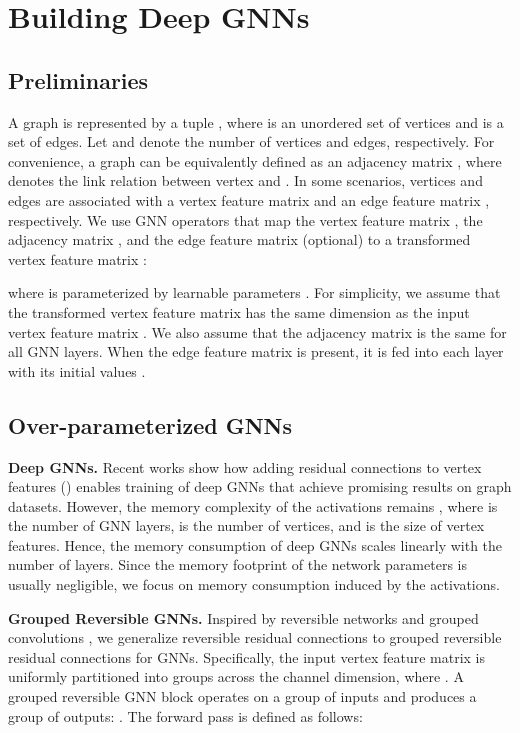 \documentclass{article}
\newcommand{\mysection}[1]{\vspace{0pt}\noindent\textbf{#1.}}
\begin{document}
\section{Building Deep GNNs}
\subsection{Preliminaries}
A graph  is represented by a tuple , where  is an unordered set of vertices and  is a set of edges. Let  and  denote the number of vertices and edges, respectively. For convenience, a graph can be equivalently defined as an adjacency matrix , where  denotes the link relation between vertex  and . In some scenarios, vertices and edges are associated with a vertex feature matrix  and an edge feature matrix , respectively.
We use GNN operators that map the vertex feature matrix , the adjacency matrix , and the edge feature matrix  (optional) to a transformed vertex feature matrix :

where  is parameterized by learnable parameters . For simplicity, we assume that the transformed vertex feature matrix  has the same dimension as the input vertex feature matrix . We also assume that the adjacency matrix  is the same for all GNN layers. When the edge feature matrix  is present, it is fed into each layer with its initial values .

\subsection{Over-parameterized GNNs}
\mysection{Deep GNNs}  Recent works \citep{li2019deepgcns, li2020deepergcn} show how adding residual connections \citep{he2016deep} to vertex features () enables training of deep GNNs that achieve promising results on graph datasets. 
However, the memory complexity of the activations remains , where  is the number of GNN layers,  is the number of vertices, and  is the size of vertex features. Hence, the memory consumption of deep GNNs scales linearly with the number of layers. Since the memory footprint of the network parameters is usually negligible, we focus on memory consumption induced by the activations.

\mysection{Grouped Reversible GNNs} \label{grgnn}
Inspired by reversible networks \citep{gomez2017reversible,liu2019gnf, kitaev2019reformer}
and grouped convolutions \citep{krizhevsky2012imagenet, xie2017aggregated}, we generalize reversible residual connections to grouped reversible residual connections for GNNs. 
Specifically, the input vertex feature matrix  is uniformly partitioned into  groups
 across the channel dimension, where .
A grouped reversible GNN block operates on a group of inputs and produces a group of outputs: . The forward pass is defined as follows:
\end{document}
